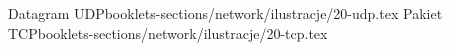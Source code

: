 \documentclass{standalone}
\begin{document}
	{Datagram UDP}{booklets-sections/network/ilustracje/20-udp.tex}
	{Pakiet TCP}{booklets-sections/network/ilustracje/20-tcp.tex}
\end{document}
